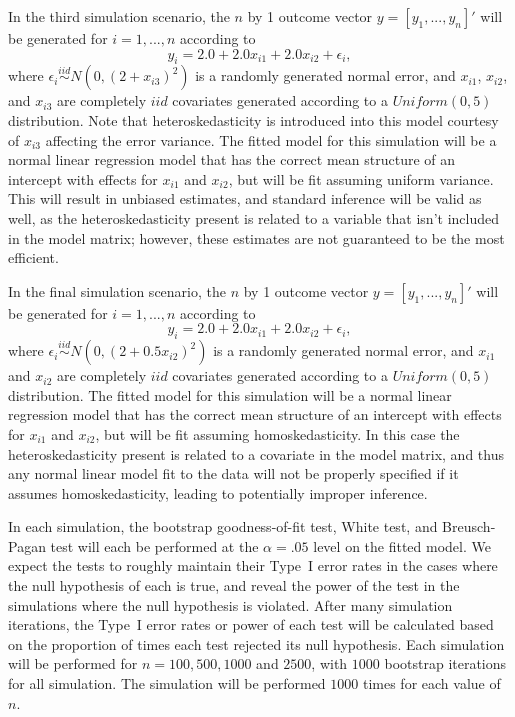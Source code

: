 \documentclass[12pt]{article} %
\theoremstyle{definition}
\begin{document}
In the third simulation scenario, the $n$ by 1 outcome vector $y = [y_1,...,y_n]'$ will be generated for $i = 1,...,n$ according to
\begin{equation*}
	y_i = 2.0 + 2.0 x_{i1} + 2.0 x_{i2} + \epsilon_i , 
\end{equation*}
where $\epsilon_i \stackrel{iid}{\sim} N \left( 0,(2 + x_{i3})^2 \right)$ is a randomly generated normal error, and $x_{i1}$, $x_{i2}$, and $x_{i3}$ are completely $iid$ covariates
generated according to a $Uniform(0,5)$ distribution. Note that heteroskedasticity is introduced into this model courtesy of $x_{i3}$ affecting the error variance. The fitted model for
this simulation will be a normal linear regression model that has the correct mean structure of an intercept with effects for $x_{i1}$ and $x_{i2}$, but will be fit assuming uniform variance.
This will result in unbiased estimates, and standard inference will be valid as well, as the heteroskedasticity present is related to a variable that isn't included in the model matrix; however,
these estimates are not guaranteed to be the most efficient.

In the final simulation scenario, the $n$ by 1 outcome vector $y = [y_1,...,y_n]'$ will be generated for $i = 1,...,n$ according to
\begin{equation*}
	y_i = 2.0 + 2.0 x_{i1} + 2.0 x_{i2} + \epsilon_i , 
\end{equation*}
where $\epsilon_i \stackrel{iid}{\sim} N \left( 0,(2 + 0.5 x_{i2})^2 \right)$ is a randomly generated normal error, and $x_{i1}$ and $x_{i2}$ are completely $iid$ covariates generated according to
a $Uniform(0,5)$ distribution. The fitted model for this simulation will be a normal linear regression model that has the correct mean structure of an intercept with effects for $x_{i1}$ and $x_{i2}$,
but will be fit assuming homoskedasticity. In this case the heteroskedasticity present is related to a covariate in the model matrix, and thus any normal linear model fit to the data will not be properly
specified if it assumes homoskedasticity, leading to potentially improper inference.

In each simulation, the bootstrap goodness-of-fit test, White test, and Breusch-Pagan test will each be performed at the $\alpha = .05$ level on the  fitted model. We expect the tests to roughly maintain their
Type~I error rates in the cases where the null hypothesis of each is true, and reveal the power of the test in the simulations where the null hypothesis is violated. After many simulation iterations, the
Type~I error rates or power of each test will be calculated based on the proportion of times each test rejected its null hypothesis. Each simulation will be performed for $n = 100, 500, 1000$ and $2500$, with $1000$
bootstrap iterations for all simulation. The simulation will be performed $1000$ times for each value of $n$.
\end{document}

